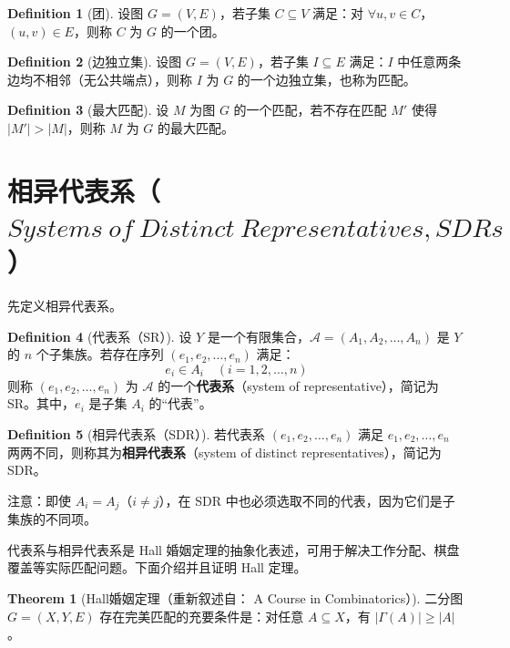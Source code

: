 \documentclass[oneside]{book}
\theoremstyle{definition}
\newtheorem{definition}{Definition}[section]
\newtheorem{theorem}{Theorem}[section]
\begin{document}
\begin{definition}[团]
	设图 \( G = (V, E) \)，若子集 \( C \subseteq V \) 满足：对 \( \forall u, v \in C \)，\( (u, v) \in E \)，则称 \( C \) 为 \( G \) 的一个团。
\end{definition}

\begin{definition}[边独立集]
	设图 \( G = (V, E) \)，若子集 \( I \subseteq E \) 满足：\( I \) 中任意两条边均不相邻（无公共端点），则称 \( I \) 为 \( G \) 的一个边独立集，也称为匹配。
\end{definition}

\begin{definition}[最大匹配]
	设 \( M \) 为图 \( G \) 的一个匹配，若不存在匹配 \( M' \) 使得 \( |M'| > |M| \)，则称 \( M \) 为 \( G \) 的最大匹配。
\end{definition}








\section{相异代表系（\(Systems\ of\ Distinct\ Representatives,SDRs\)）}

先定义相异代表系。
\begin{definition}[代表系（SR）]
	设 \( Y \) 是一个有限集合，\( \mathcal{A} = (A_1, A_2, \dots, A_n) \) 是 \( Y \) 的 \( n \) 个子集族。若存在序列 \( (e_1, e_2, \dots, e_n) \) 满足：
	\[ e_i \in A_i \quad (i = 1, 2, \dots, n) \]
	则称 \( (e_1, e_2, \dots, e_n) \) 为 \( \mathcal{A} \) 的一个\textbf{代表系}（system of representative），简记为 SR。其中，\( e_i \) 是子集 \( A_i \) 的“代表”。
\end{definition}

\begin{definition}[相异代表系（SDR）]
	若代表系 \( (e_1, e_2, \dots, e_n) \) 满足 \( e_1, e_2, \dots, e_n \) 两两不同，则称其为\textbf{相异代表系}（system of distinct representatives），简记为 SDR。
	
	\noindent 注意：即使 \( A_i = A_j \)（\( i \neq j \)），在 SDR 中也必须选取不同的代表，因为它们是子集族的不同项。
\end{definition}
代表系与相异代表系是 Hall 婚姻定理的抽象化表述，可用于解决工作分配、棋盘覆盖等实际匹配问题。下面介绍并且证明 Hall 定理。
\begin{theorem}[Hall婚姻定理（重新叙述自： A Course in Combinatorics）]
	二分图 \( G = (X, Y, E) \) 存在完美匹配的充要条件是：对任意 \( A \subseteq X \)，有 \( |\Gamma(A)| \geq |A| \)。
\end{theorem}
\end{document}

